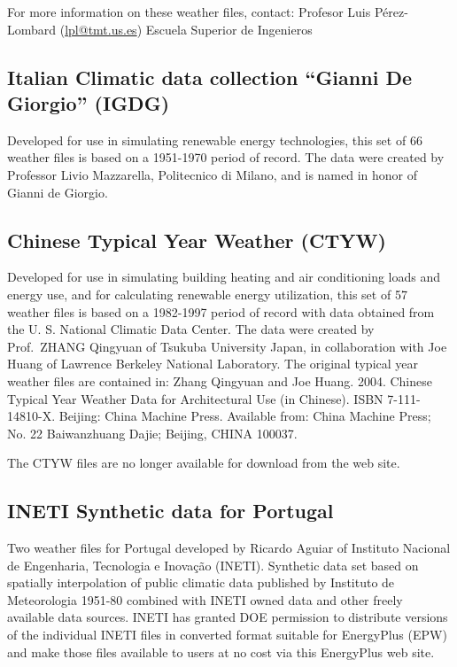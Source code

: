 For more information on these weather files, contact: Profesor Luis Pérez-Lombard (\href{file:///E:/Docs4PDFs/lpl@tmt.us.es}{lpl@tmt.us.es}) Escuela Superior de Ingenieros

\subsection{Italian Climatic data collection ``Gianni De Giorgio'' (IGDG)}\label{italian-climatic-data-collection-gianni-de-giorgio-igdg}

Developed for use in simulating renewable energy technologies, this set of 66 weather files is based on a 1951-1970 period of record. The data were created by Professor Livio Mazzarella, Politecnico di Milano, and is named in honor of Gianni de Giorgio.

\subsection{Chinese Typical Year Weather (CTYW)}\label{chinese-typical-year-weather-ctyw}

Developed for use in simulating building heating and air conditioning loads and energy use, and for calculating renewable energy utilization, this set of 57 weather files is based on a 1982-1997 period of record with data obtained from the U. S. National Climatic Data Center. The data were created by Prof.~ZHANG Qingyuan of Tsukuba University Japan, in collaboration with Joe Huang of Lawrence Berkeley National Laboratory. The original typical year weather files are contained in: Zhang Qingyuan and Joe Huang. 2004. Chinese Typical Year Weather Data for Architectural Use (in Chinese). ISBN 7-111-14810-X. Beijing: China Machine Press. Available from: China Machine Press; No. 22 Baiwanzhuang Dajie; Beijing, CHINA 100037.

The CTYW files are no longer available for download from the web site.

\subsection{INETI Synthetic data for Portugal}\label{ineti-synthetic-data-for-portugal}

Two weather files for Portugal developed by Ricardo Aguiar of Instituto Nacional de Engenharia, Tecnologia e Inovação (INETI). Synthetic data set based on spatially interpolation of public climatic data published by Instituto de Meteorologia 1951-80 combined with INETI owned data and other freely available data sources. INETI has granted DOE permission to distribute versions of the individual INETI files in converted format suitable for EnergyPlus (EPW) and make those files available to users at no cost via this EnergyPlus web site.

